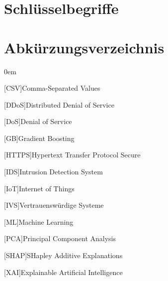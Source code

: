 \section{Schlüsselbegriffe}


\section{Abkürzungsverzeichnis}\label{abkuerzungen}


\begin{addmargin}[1.5em]{0em}

    \begin{acronym}[CICIoT2023] %

        [CSV]{Comma-Separated Values}

        [DDoS]{Distributed Denial of Service}

        [DoS]{Denial of Service}

        [GB]{Gradient Boosting}

        [HTTPS]{Hypertext Transfer Protocol Secure}

        [IDS]{Intrusion Detection System}

        [IoT]{Internet of Things}

        [IVS]{Vertrauenswürdige Systeme}

        [ML]{Machine Learning}

        [PCA]{Principal Component Analysis}

        [SHAP]{SHapley Additive Explanations}

        [XAI]{Explainable Artificial Intelligence}

    \end{acronym}

\end{addmargin}